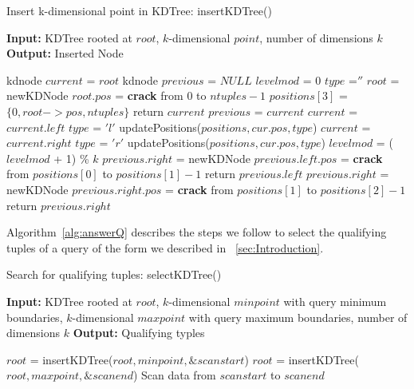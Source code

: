 \begin{algorithm}[t] 
\caption{Insert k-dimensional point in KDTree: insertKDTree()}
\textbf{Input: }KDTree rooted at $root$, $k$-dimensional $point$, number of dimensions $k$ \newline
\textbf{Output: }Inserted Node

\label{alg:insertKDTree}
\begin{algorithmic}[1]
\STATE kdnode $current$ = $root$ %
\STATE kdnode $previous$ = $NULL$ 
\STATE $levelmod$ = 0
\STATE $type$ =$''$
\STATE $root$ = newKDNode %
\STATE $root.pos$ = \textbf{crack} from $0$ to $ntuples-1$%
\ENDIF
\STATE $positions[3]$ = $\{0, root->pos, ntuples\}$
\STATE return $current$
\ENDIF
\STATE $previous$ = $current$
\STATE $current$ = $current.left$ %
\STATE $type$ = $'l'$
\STATE updatePositions($positions,cur.pos,type$)
\ENDIF
\ELSE
\STATE $current$ = $current.right$ %
\STATE $type$ = $'r'$
\STATE updatePositions($positions,cur.pos,type$)
\ENDIF
\ENDIF
\STATE $levelmod$ = ($levelmod$ + 1) \% $k$
\ENDWHILE
{}
\STATE $previous.right$ = newKDNode
\STATE $previous.left.pos$ = \textbf{crack} from $positions[0]$ to $positions[1]-1$ %
\STATE return $previous.left$
\ELSE
\STATE $previous.right$ = newKDNode
\STATE $previous.right.pos$ = \textbf{crack}  from $positions[1]$ to $positions[2]-1$ %
\STATE return $previous.right$
\ENDIF
\end{algorithmic}
\end{algorithm}


Algorithm~\ref{alg:answerQ} describes the steps we follow to select the qualifying tuples of a query of the form we described in ~\ref{sec:Introduction}.


\begin{algorithm}[t] 
\caption{Search for qualifying tuples: selectKDTree()}
\textbf{Input: }KDTree rooted at $root$, $k$-dimensional $minpoint$ with query minimum boundaries, $k$-dimensional $maxpoint$  with query maximum boundaries, number of dimensions $k$ \newline
\textbf{Output: }Qualifying typles

\label{alg:answerQ}
\begin{algorithmic}[1]
\STATE $root$ = insertKDTree($root, minpoint, \&scanstart$)
\STATE $root$ = insertKDTree($root, maxpoint, \&scanend$)
\STATE Scan data from $scanstart$ to $scanend$
\end{algorithmic}
\end{algorithm}




